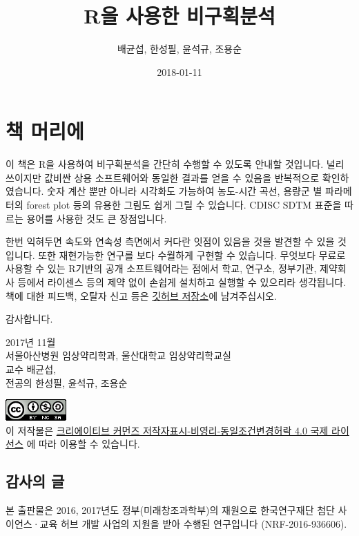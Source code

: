 \documentclass[12pt,]{krantz}
\title{R을 사용한 비구획분석}
\author{배균섭, 한성필, 윤석규, 조용순}
\date{2018-01-11}
\theoremstyle{definition}
\theoremstyle{definition}
\theoremstyle{definition}
\theoremstyle{remark}
\let\BeginKnitrBlock\begin \let\EndKnitrBlock\end
\begin{document}
\maketitle

{
\hypersetup{linkcolor=black}
\setcounter{tocdepth}{2}
\tableofcontents
}
\chapter*{책 머리에}\label{-}


\href{https://github.com/asancpt/book-ncar}{}

이 책은 R을 사용하여 비구획분석을 간단히 수행할 수 있도록 안내할
것입니다. 널리 쓰이지만 값비싼 상용 소프트웨어와 동일한 결과를 얻을 수
있음을 반복적으로 확인하였습니다. 숫자 계산 뿐만 아니라 시각화도
가능하여 농도-시간 곡선, 용량군 별 파라메터의 forest plot 등의 유용한
그림도 쉽게 그릴 수 있습니다. CDISC SDTM 표준을 따르는 용어를 사용한
것도 큰 장점입니다.

한번 익혀두면 속도와 연속성 측면에서 커다란 잇점이 있음을 것을 발견할 수
있을 것입니다. 또한 재현가능한 연구를 보다 수월하게 구현할 수 있습니다.
무엇보다 무료로 사용할 수 있는 R기반의 공개 소프트웨어라는 점에서 학교,
연구소, 정부기관, 제약회사 등에서 라이센스 등의 제약 없이 손쉽게
설치하고 실행할 수 있으리라 생각됩니다. 책에 대한 피드백, 오탈자 신고
등은 \href{https://github.com/asancpt/book-ncar/issues}{깃허브 저장소}에
남겨주십시오.

감사합니다.

2017년 11월\\
서울아산병원 임상약리학과, 울산대학교 임상약리학교실\\
교수 배균섭,\\
전공의 한성필, 윤석규, 조용순

\includegraphics{assets/cc.png}\\
이 저작물은
\href{http://creativecommons.org/licenses/by-nc-sa/4.0/}{크리에이티브
커먼즈 저작자표시-비영리-동일조건변경허락 4.0 국제 라이선스} 에 따라
이용할 수 있습니다.

\section*{감사의 글}\label{-}


\BeginKnitrBlock{rmdnote}
본 출판물은 2016, 2017년도 정부(미래창조과학부)의 재원으로 한국연구재단
첨단 사이언스·교육 허브 개발 사업의 지원을 받아 수행된 연구입니다
(NRF-2016-936606).
\EndKnitrBlock{rmdnote}
\end{document}
